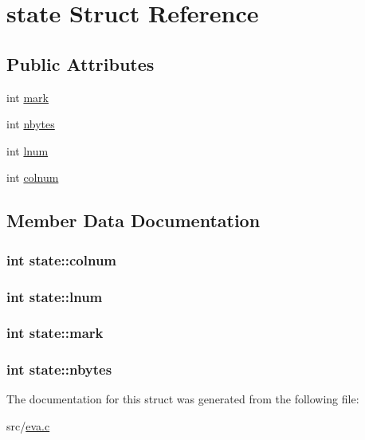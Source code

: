 \hypertarget{structstate}{\section{state Struct Reference}
\label{structstate}
}
\subsection*{Public Attributes}
\begin{DoxyCompactItemize}
\item 
int \hyperlink{structstate_a2c8062be35098ba9a99938a454e89234}{mark}
\item 
int \hyperlink{structstate_adb154caf421ac65453883661669c8cf6}{nbytes}
\item 
int \hyperlink{structstate_a0e916dd98687e9758c6ff8a242d32b90}{lnum}
\item 
int \hyperlink{structstate_a167f492cb27a9d64ae38f1a9131ad2eb}{colnum}
\end{DoxyCompactItemize}


\subsection{Member Data Documentation}
\hypertarget{structstate_a167f492cb27a9d64ae38f1a9131ad2eb}{
\subsubsection[{colnum}]{\setlength{\rightskip}{0pt plus 5cm}int state\-::colnum}}\label{structstate_a167f492cb27a9d64ae38f1a9131ad2eb}
\hypertarget{structstate_a0e916dd98687e9758c6ff8a242d32b90}{
\subsubsection[{lnum}]{\setlength{\rightskip}{0pt plus 5cm}int state\-::lnum}}\label{structstate_a0e916dd98687e9758c6ff8a242d32b90}
\hypertarget{structstate_a2c8062be35098ba9a99938a454e89234}{
\subsubsection[{mark}]{\setlength{\rightskip}{0pt plus 5cm}int state\-::mark}}\label{structstate_a2c8062be35098ba9a99938a454e89234}
\hypertarget{structstate_adb154caf421ac65453883661669c8cf6}{
\subsubsection[{nbytes}]{\setlength{\rightskip}{0pt plus 5cm}int state\-::nbytes}}\label{structstate_adb154caf421ac65453883661669c8cf6}


The documentation for this struct was generated from the following file\-:\begin{DoxyCompactItemize}
\item 
src/\hyperlink{eva_8c}{eva.\-c}\end{DoxyCompactItemize}
